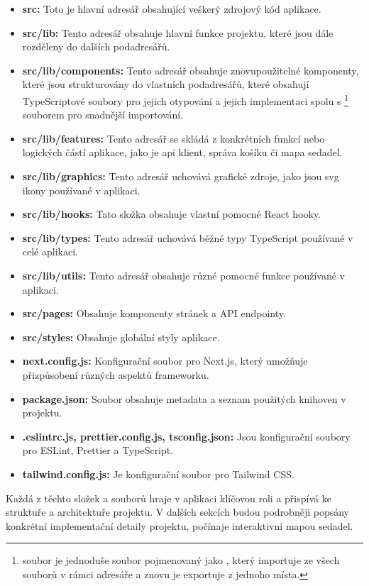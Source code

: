 \begin{itemize}
    \item \textbf{src:} Toto je hlavní adresář obsahující veškerý zdrojový kód aplikace.
    \item \textbf{src/lib:} Tento adresář obsahuje hlavní funkce projektu, které jsou dále rozděleny do dalších podadresářů.
    \item \textbf{src/lib/components:} Tento adresář obsahuje znovupoužitelné komponenty, které jsou strukturovány do vlastních podadresářů, které obsahují TypeScriptové soubory pro jejich otypování a jejich implementaci spolu s \footnote{ soubor je jednoduše soubor pojmenovaný jako , který importuje ze všech souborů v rámci adresáře a znovu je exportuje z jednoho místa.} souborem pro snadnější importování.
    \item \textbf{src/lib/features:} Tento adresář se skládá z konkrétních funkcí nebo logických částí aplikace, jako je \ac{api} klient, správa košíku či mapa sedadel.
    \item \textbf{src/lib/graphics:} Tento adresář uchovává grafické zdroje, jako jsou \ac{svg} ikony používané v aplikaci.
    \item \textbf{src/lib/hooks:} Tato složka obsahuje vlastní pomocné React hooky.
    \item \textbf{src/lib/types:} Tento adresář uchovává běžné typy TypeScript používané v celé aplikaci.
    \item \textbf{src/lib/utils:} Tento adresář obsahuje různé pomocné funkce používané v aplikaci.
    \item \textbf{src/pages:} Obsahuje komponenty stránek a \ac{API} endpointy.
    \item \textbf{src/styles:} Obsahuje globální styly aplikace.
    \item \textbf{next.config.js:} Konfigurační soubor pro Next.js, který umožňuje přizpůsobení různých aspektů frameworku.
    \item \textbf{package.json:} Soubor obsahuje metadata a seznam použitých knihoven v projektu.
    \item \textbf{.eslintrc.js, prettier.config.js, tsconfig.json:} Jsou konfigurační soubory pro ESLint, Prettier a TypeScript.
    \item \textbf{tailwind.config.js:} Je konfigurační soubor pro Tailwind CSS\@.
\end{itemize}

Každá z těchto složek a souborů hraje v aplikaci klíčovou roli a přispívá ke struktuře a architektuře projektu.
V dalších sekcích budou podrobněji popsány konkrétní implementační detaily projektu, počínaje interaktivní mapou sedadel.
